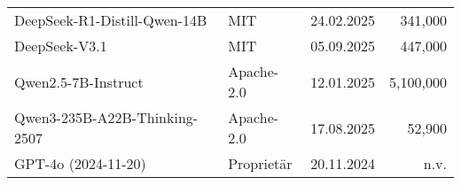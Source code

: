 \begin{sidewaystable}[htbp]
\begin{threeparttable}
\begin{subtable}[t]{0.49\linewidth}
\begin{tabular}{@{}p{6.3cm} l r r@{}}
                DeepSeek-R1-Distill-Qwen-14B & MIT & 24.02.2025 & 341{,}000 \cite{HF_DeepSeekR1_Distill_Qwen14B_2025} \\
                DeepSeek-V3.1 & MIT & 05.09.2025 & 447{,}000 \cite{HF_DeepSeek_V3_2_2025} \\
                Qwen2.5-7B-Instruct & Apache-2.0 & 12.01.2025 & 5{,}100{,}000 \cite{HF_Qwen7B_2025} \\
                Qwen3-235B-A22B-Thinking-2507 & Apache-2.0 & 17.08.2025 & 52{,}900 \cite{HF_Qwen3_235B_2025} \\
                GPT-4o (2024-11-20) & Proprietär & 20.11.2024 & n.v. \cite{openai-hello-gpt-4o} \\
                \bottomrule
            \end{tabular}
        \end{subtable}
    \end{threeparttable}
\end{sidewaystable}